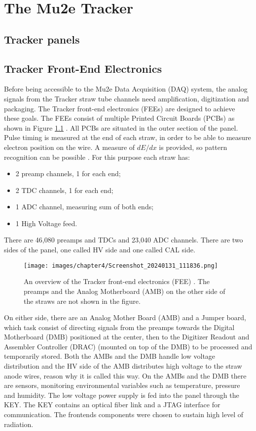 \chapter{The Mu2e Tracker}\label{chaptertrk}
\section{Tracker panels}
\section{Tracker Front-End Electronics}
Before being accessible to the Mu2e Data Acquisition (DAQ) system, the analog signals from the Tracker straw tube channels need amplification, digitization and packaging. The Tracker front-end electronics (FEEs) are designed to achieve these goals. The FEEs consist of multiple Printed Circuit Boards (PCBs) as shown in Figure \ref{fig:trackerfee} \cite{vadimmu2e}.
All PCBs are situated in the outer section of the panel. Pulse timing is measured at the end of each straw, in order to be able to measure electron position on the wire. A measure of $dE/dx$ is provided, so pattern recognition can be possible \cite{bartoszek2015mu2e}. For this purpose each straw has:
\begin{itemize}
    \item 2 preamp channels, 1 for each end;
    \item 2 TDC channels, 1 for each end;
    \item 1 ADC channel, measuring sum of both ends;
    \item 1 High Voltage feed.
\end{itemize}
There are 46,080 preamps and TDCs and 23,040 ADC channels. There are two sides of the panel, one called HV side and one called CAL side. 
\begin{figure}[!h]
\centering
\texttt{[image: images/chapter4/Screenshot\_20240131\_111836.png]}
\caption{An overview of the Tracker front-end electronics (FEE) \cite{vadimmu2e}. The preamps and the Analog Motherboard (AMB) on the other side of the straws are not shown in the figure.}
\label{fig:trackerfee}
\end{figure}
On either side, there are an Analog Mother Board (AMB) and a Jumper board, which task consist of directing signals from the preamps towards the Digital Motherboard (DMB) positioned at the center, then to the Digitizer Readout and Assembler Controller (DRAC) (mounted on top of the DMB) to be processed and temporarily stored. Both the AMBs and the DMB handle low voltage distribution and the HV side of the AMB distributes high voltage to the straw anode wires, reason why it is called this way. On the AMBs and the DMB there are sensors, monitoring environmental variables such as temperature, pressure and humidity. The low voltage power supply is fed into the panel through the KEY. The KEY contains an optical fiber link and a JTAG interface for communication. The frontends components were chosen to sustain high level of radiation.
